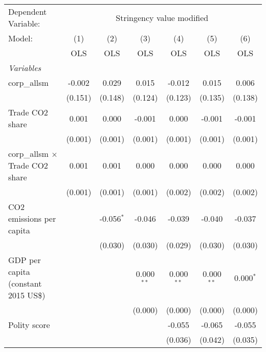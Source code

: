 
\begingroup
\centering
\begin{tabular}{lcccccc}
   \toprule
   Dependent Variable: & \multicolumn{6}{c}{Stringency value modified}\\
   Model:                                 & (1)     & (2)          & (3)          & (4)          & (5)          & (6)\\  
                                          &  OLS    & OLS          & OLS          & OLS          & OLS          & OLS\\  
   \midrule
   \emph{Variables}\\
   corp\_allsm                            & -0.002  & 0.029        & 0.015        & -0.012       & 0.015        & 0.006\\   
                                          & (0.151) & (0.148)      & (0.124)      & (0.123)      & (0.135)      & (0.138)\\   
   Trade CO2 share                        & 0.001   & 0.000        & -0.001       & 0.000        & -0.001       & -0.001\\   
                                          & (0.001) & (0.001)      & (0.001)      & (0.001)      & (0.001)      & (0.001)\\   
   corp\_allsm $\times$ Trade CO2 share   & 0.001   & 0.001        & 0.000        & 0.000        & 0.000        & 0.000\\   
                                          & (0.001) & (0.001)      & (0.001)      & (0.002)      & (0.002)      & (0.002)\\   
   CO2 emissions per capita               &         & -0.056$^{*}$ & -0.046       & -0.039       & -0.040       & -0.037\\   
                                          &         & (0.030)      & (0.030)      & (0.029)      & (0.030)      & (0.030)\\   
   GDP per capita (constant 2015 US\$)    &         &              & 0.000$^{**}$ & 0.000$^{**}$ & 0.000$^{**}$ & 0.000$^{*}$\\   
                                          &         &              & (0.000)      & (0.000)      & (0.000)      & (0.000)\\   
   Polity score                           &         &              &              & -0.055       & -0.065       & -0.055\\   
                                          &         &              &              & (0.036)      & (0.042)      & (0.035)\\   

\end{tabular}

